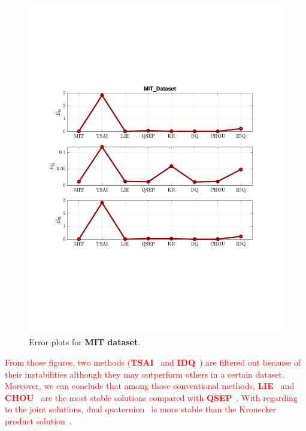\begin{figure}
\centering
\includegraphics[scale=0.7]{./hand_eye_figures/real/Result_MIT_Dataset}
\caption{Error plots for \textbf{MIT dataset}.}
\end{figure}

\textcolor{red}{
From those figures, two methods (\textbf{TSAI}~\cite{tsai1989new} and \textbf{IDQ}~\cite{malti2010robust}) are filtered out because of their instabilities although they may outperform others in a certain dataset. Moreover, we can conclude that among those conventional methods, \textbf{LIE}~\cite{park1994robot} and \textbf{CHOU}~\cite{chou1991finding} are the most stable solutions compared with \textbf{QSEP}~\cite{horaud1995hand}. With regarding to the joint solutions, dual quaternion~\cite{daniilidis1999hand} is more stable than the Kronecker product solution~\cite{andreff1999line}}.

